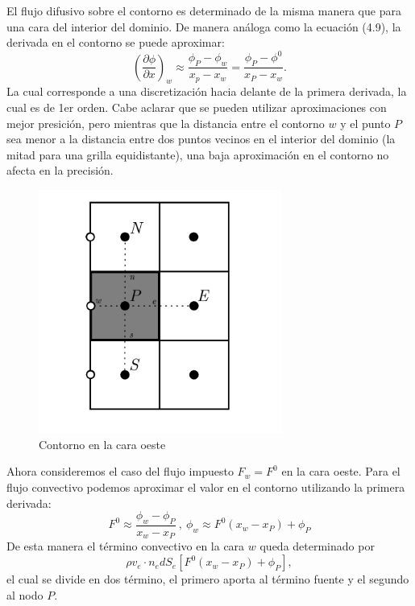 \documentclass[a4paper,10pt, oneside]{book}
\begin{document}
El flujo difusivo sobre el contorno es determinado de la misma manera que para una cara del interior del dominio. De manera análoga como la ecuación (4.9), la derivada en el contorno se puede aproximar:
\begin{equation}
	\left( \frac{\partial \phi}{\partial x} \right)_w \approx \frac{\phi_P - \phi_w}{x_p - x_w} = \frac{\phi_P - \phi^0}{x_P -x_w}.
\end{equation}
La cual corresponde a una discretización hacia delante de la primera derivada, la cual es de 1er orden. Cabe aclarar que se pueden utilizar aproximaciones con mejor presición, pero mientras que la distancia entre el contorno $w$ y el punto $P$ sea menor a la distancia entre dos puntos vecinos en el interior del dominio (la mitad para una grilla equidistante), una baja aproximación en el contorno no afecta en la precisión.
\begin{figure}[h!]
	\centering
	\includegraphics[width=8cm]{Img/4-13}
	\caption{Contorno en la cara oeste}
	\label{img:4-13}
\end{figure}

Ahora consideremos el caso del flujo impuesto $F_w = F^0$ en la cara oeste. Para el flujo convectivo podemos aproximar el valor en el contorno utilizando la primera derivada:
\begin{equation}
	F^0 \approx \frac{\phi_w - \phi_P}{x_w - x_P} ~ , ~ \phi_w \approx F^0 (x_w - x_P) + \phi_P \nonumber
\end{equation} 
De esta manera el término convectivo en la cara $w$ queda determinado por
\begin{equation}
	\rho v_e \cdot n_e dS_e [F^0 (x_w - x_P) + \phi_P], \nonumber
\end{equation}
el cual se divide en dos término, el primero aporta al término fuente y el segundo al nodo $P$. 
\end{document}
